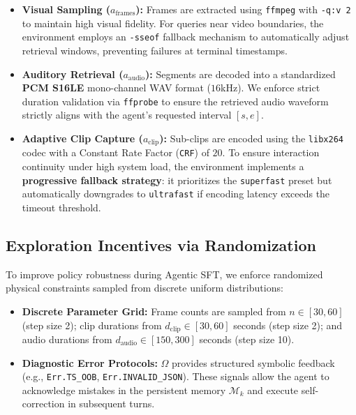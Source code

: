 \documentclass{article}
\theoremstyle{plain}
\theoremstyle{definition}
\theoremstyle{remark}
\begin{document}
\begin{itemize}[leftmargin=15pt, topsep=2pt]
    \item \textbf{Visual Sampling ($a_{\text{frames}}$):} Frames are extracted using \texttt{ffmpeg} with \texttt{-q:v 2} to maintain high visual fidelity. For queries near video boundaries, the environment employs an \texttt{-sseof} fallback mechanism to automatically adjust retrieval windows, preventing failures at terminal timestamps.
    
    \item \textbf{Auditory Retrieval ($a_{\text{audio}}$):} Segments are decoded into a standardized \textbf{PCM S16LE} mono-channel WAV format ($16$kHz). We enforce strict duration validation via \texttt{ffprobe} to ensure the retrieved audio waveform strictly aligns with the agent's requested interval $[s, e]$.
    
    \item \textbf{Adaptive Clip Capture ($a_{\text{clip}}$):} Sub-clips are encoded using the \texttt{libx264} codec with a Constant Rate Factor (\texttt{CRF}) of $20$. To ensure interaction continuity under high system load, the environment implements a \textbf{progressive fallback strategy}: it prioritizes the \texttt{superfast} preset but automatically downgrades to \texttt{ultrafast} if encoding latency exceeds the timeout threshold.
\end{itemize}

\subsection{Exploration Incentives via Randomization}
To improve policy robustness during Agentic SFT, we enforce randomized physical constraints sampled from discrete uniform distributions:
\begin{itemize}[leftmargin=15pt, topsep=2pt]
    \item \textbf{Discrete Parameter Grid:} 
    Frame counts are sampled from $n \in [30, 60]$ (step size 2); 
    clip durations from $d_{\text{clip}} \in [30, 60]$ seconds (step size 2); 
    and audio durations from $d_{\text{audio}} \in [150, 300]$ seconds (step size 10).
    
    \item \textbf{Diagnostic Error Protocols:} $\Omega$ provides structured symbolic feedback (e.g., \texttt{Err.TS\_OOB}, \texttt{Err.INVALID\_JSON}). These signals allow the agent to acknowledge mistakes in the persistent memory $\mathcal{M}_k$ and execute self-correction in subsequent turns.
\end{itemize}
\end{document}
